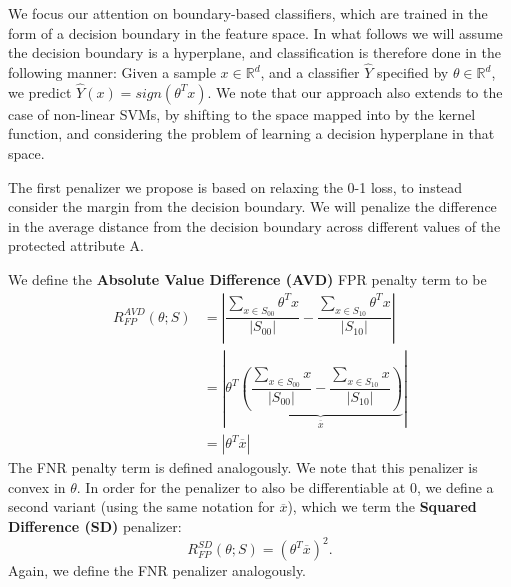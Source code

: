 We focus our attention on boundary-based classifiers, which are trained in the form of a decision boundary in the feature space. In what follows we will assume the decision boundary is a hyperplane, and classification is therefore done in the following manner: Given a sample $x \in \mathbb{R}^d$, and a classifier $\hat{Y}$ specified by $\theta \in \mathbb{R}^d$, we predict $\hat{Y}(x) = sign(\theta^T x)$. We note that our approach also extends to the case of non-linear SVMs, by shifting to the space mapped into by the kernel function, and considering the problem of learning a decision hyperplane in that space. %

The first penalizer we propose is based on relaxing the 0-1 loss, to instead consider the margin from the decision boundary. We will penalize the difference in the average distance from the decision boundary across different values of  the protected attribute A.



We define the \textbf{Absolute Value Difference (AVD)} FPR penalty term to be
\begin{align*}
R_{FP}^{AVD}(\theta;S) &= \left|\dfrac{\sum\limits_{x\in S_{00}}^{} \theta^T x}{\left|S_{00}\right|} - \dfrac{\sum\limits_{x\in S_{10}}^{} \theta^T x}{\left|S_{10}\right|}\right| \\
&= \left|\theta^T\underbrace{\left(\dfrac{\sum\limits_{x\in S_{00}}^{} x}{\left|S_{00}\right|} - \dfrac{\sum\limits_{x\in S_{10}}^{} x}{\left|S_{10}\right|}\right)}_{\overline{x}}\right| \\
&= \left|\theta^T \overline{x} \right|
\end{align*}
The FNR penalty term is defined analogously. We note that this penalizer is convex in $\theta$. In order for the penalizer to also be differentiable at 0, we define a second variant (using the same notation for $\overline{x}$), which we term the \textbf{Squared Difference (SD)} penalizer:
\begin{equation*}
R_{FP}^{SD}(\theta;S) = \left(\theta^T \overline{x} \right)^2.
\end{equation*}
Again, we define the FNR penalizer analogously.